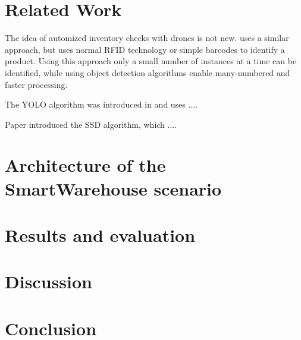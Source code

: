 \documentclass[a4paper, 10pt, journal]{wissarbIEEE}      %
\begin{document}
\section{Related Work} \label{relatedwork}

The idea of automized inventory checks with drones is not new. \cite{doks.innovationGmbH.2020} uses a similar approach, but uses normal RFID technology or simple barcodes to identify a product. Using this approach only a small number of instances at a time can be identified, while using object detection algorithms enable many-numbered and faster processing. 

The YOLO algorithm was introduced in \cite{JosephRedmonSantoshDivvalaRossGirshickAliFarhadi.2016} and uses ....

Paper \cite{WeiLiuDragomirAnguelovDumitruErhanChristianSzegedyScottReedChengYangFuAlexander.2016} introduced the SSD algorithm, which ....

\section{Architecture of the SmartWarehouse scenario} \label{architecture}

\section{Results and evaluation} \label{evaluation}

\section{Discussion} \label{results}

\section{Conclusion} \label{conclusion}


\end{document}
